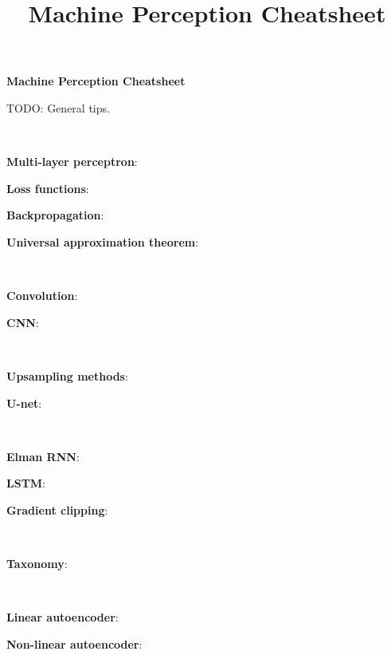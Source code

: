 \documentclass{article}
\title{Machine Perception Cheatsheet}
\newenvironment{topic}[1]
{\textbf{\sffamily \colorbox{black}{\rlap{\textbf{\textcolor{white}{#1}}}\hspace{\linewidth}\hspace{-2\fboxsep}}} \\ \vspace{0.2cm}}
{}
\begin{document}
\setlength{\columnsep}{0.2cm}

\textbf{\LARGE Machine Perception Cheatsheet} \\
\hrulefill

\begin{multicols*}{2}

    TODO: General tips.

    \begin{topic}{Neural networks}

        \textbf{Multi-layer perceptron}:

        \textbf{Loss functions}:

        \textbf{Backpropagation}:

        \textbf{Universal approximation theorem}:

    \end{topic}

    \begin{topic}{Convolutional neural networks}

        \textbf{Convolution}:

        \textbf{CNN}:

    \end{topic}

    \begin{topic}{Fully convolutional neural networks}

        \textbf{Upsampling methods}:

        \textbf{U-net}:

    \end{topic}

    \begin{topic}{Recurrent neural networks}

        \textbf{Elman RNN}:

        \textbf{LSTM}:

        \textbf{Gradient clipping}:

    \end{topic}

    \begin{topic}{Generative models}

        \textbf{Taxonomy}:

    \end{topic}

    \begin{topic}{Autoencoders}

        \textbf{Linear autoencoder}:

        \textbf{Non-linear autoencoder}:


\end{topic}
\end{multicols*}
\end{document}
